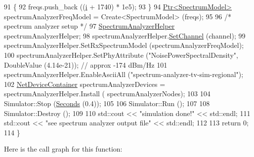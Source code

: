 \begin{DoxyCode}
91     \{
92       freqs.push\_back ((\hyperlink{bernuolliDistribution_8m_a6f6ccfcf58b31cb6412107d9d5281426}{i} + 1740) * 1e5);
93     \}
94   \hyperlink{classns3_1_1Ptr}{Ptr<SpectrumModel>} spectrumAnalyzerFreqModel = Create<SpectrumModel> (freqs);
95 
96   \textcolor{comment}{/* spectrum analyzer setup */}
97   \hyperlink{classns3_1_1SpectrumAnalyzerHelper}{SpectrumAnalyzerHelper} spectrumAnalyzerHelper;
98   spectrumAnalyzerHelper.\hyperlink{classns3_1_1SpectrumAnalyzerHelper_a7fb7b79c0706c9aecd427af6c4148031}{SetChannel} (channel);
99   spectrumAnalyzerHelper.SetRxSpectrumModel (spectrumAnalyzerFreqModel);
100   spectrumAnalyzerHelper.SetPhyAttribute (\textcolor{stringliteral}{"NoisePowerSpectralDensity"}, DoubleValue (4.14e-21)); \textcolor{comment}{// approx
       -174 dBm/Hz}
101   spectrumAnalyzerHelper.EnableAsciiAll (\textcolor{stringliteral}{"spectrum-analyzer-tv-sim-regional"});
102   \hyperlink{classns3_1_1NetDeviceContainer}{NetDeviceContainer} spectrumAnalyzerDevices = spectrumAnalyzerHelper.Install (
      spectrumAnalyzerNodes);
103 
104   Simulator::Stop (\hyperlink{group__timecivil_ga33c34b816f8ff6628e33d5c8e9713b9e}{Seconds} (0.4));
105 
106   Simulator::Run ();
107 
108   Simulator::Destroy ();
109 
110   std::cout << \textcolor{stringliteral}{"simulation done!"} << std::endl;
111   std::cout << \textcolor{stringliteral}{"see spectrum analyzer output file"} << std::endl;
112 
113   \textcolor{keywordflow}{return} 0;
114 \}
\end{DoxyCode}


Here is the call graph for this function\+:


